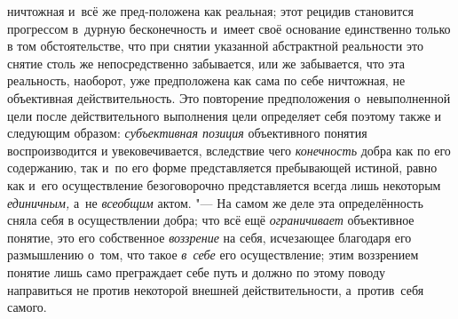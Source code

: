 ничтожная и~всё же пред-положена как реальная; этот рецидив становится
прогрессом в~дурную бесконечность и~имеет своё основание единственно только
в том обстоятельстве, что при снятии указанной абстрактной реальности это
снятие столь же непосредственно забывается, или же забывается, что эта
реальность, наоборот, уже предположена как сама по себе ничтожная, не
объективная действительность. Это повторение предположения о~невыполненной
цели после действительного выполнения цели определяет себя поэтому также и
следующим образом: {\em субъективная
позиция} объективного понятия воспроизводится и
увековечивается, вследствие чего
{\em конечность} добра
как по его содержанию, так и~по его форме представляется
пребывающей истиной, равно как и~его осуществление безоговорочно
представляется всегда лишь некоторым
{\em единичным,} а~не
{\em всеобщим} актом. "---
На самом же деле эта определённость сняла себя в
осуществлении добра; что всё ещё
{\em ограничивает}
объективное понятие, это его собственное
{\em воззрение} на себя,
исчезающее благодаря его размышлению о~том, что такое
{\em в~себе} его
осуществление; этим воззрением понятие лишь само преграждает себе путь и
должно по этому поводу направиться не против некоторой внешней
действительности, а~против~себя самого.

